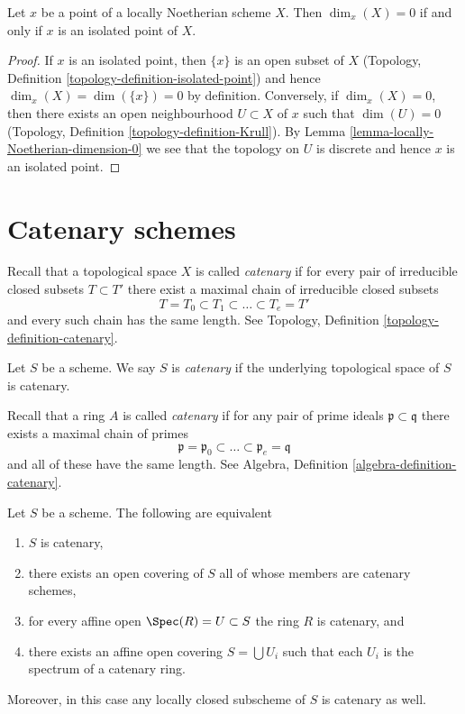 \begin{lemma}
\label{lemma-isolated-dim-0-locally-noetherian}
Let $x$ be a point of a locally Noetherian scheme $X$.
Then $\dim_x(X) = 0$ if and only if $x$ is an isolated point of $X$.
\end{lemma}

\begin{proof}
If $x$ is an isolated point, then $\{x\}$ is an open subset of $X$
(Topology, Definition \ref{topology-definition-isolated-point})
and hence $\dim_x(X) = \dim(\{x\}) = 0$ by definition. Conversely, if
$\dim_x(X) = 0$, then there exists an open neighbourhood $U \subset X$
of $x$ such that $\dim(U) = 0$
(Topology, Definition \ref{topology-definition-Krull}).
By Lemma \ref{lemma-locally-Noetherian-dimension-0}
we see that the topology on $U$ is discrete and hence
$x$ is an isolated point.
\end{proof}





\section{Catenary schemes}
\label{section-catenary}

\noindent
Recall that a topological space $X$ is called {\it catenary} if
for every pair of irreducible closed subsets $T \subset T'$
there exist a maximal chain of irreducible closed subsets
$$
T = T_0 \subset T_1 \subset \ldots \subset T_e = T'
$$
and every such chain has the same length. See
Topology, Definition \ref{topology-definition-catenary}.

\begin{definition}
\label{definition-catenary}
Let $S$ be a scheme. We say $S$ is {\it catenary} if the
underlying topological space of $S$ is catenary.
\end{definition}

\noindent
Recall that a ring $A$ is called {\it catenary} if
for any pair of prime ideals $\mathfrak p \subset \mathfrak q$
there exists a maximal chain of primes
$$
\mathfrak p =
\mathfrak p_0 \subset \ldots \subset \mathfrak p_e
= \mathfrak q
$$
and all of these have the same length. See
Algebra, Definition \ref{algebra-definition-catenary}.

\begin{lemma}
\label{lemma-catenary-local}
Let $S$ be a scheme. The following are equivalent
\begin{enumerate}
\item $S$ is catenary,
\item there exists an open covering of $S$ all of whose members are
catenary schemes,
\item for every affine open $\Spec(R) = U \subset S$ the ring
$R$ is catenary, and
\item there exists an affine open covering $S = \bigcup U_i$ such
that each $U_i$ is the spectrum of a catenary ring.
\end{enumerate}
Moreover, in this case any locally closed subscheme of $S$ is catenary
as well.
\end{lemma}

